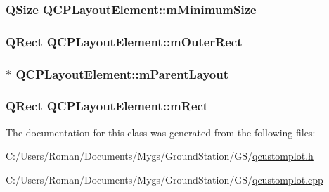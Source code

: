 \subsubsection[{m\+Minimum\+Size}]{\setlength{\rightskip}{0pt plus 5cm}Q\+Size Q\+C\+P\+Layout\+Element\+::m\+Minimum\+Size\hspace{0.3cm}{\ttfamily [protected]}}\label{class_q_c_p_layout_element_affef747c81632de33f08483b7fd10d01}
\hypertarget{class_q_c_p_layout_element_a07bb4973379e75cb0fa5b032c1d24afd}{}
\subsubsection[{m\+Outer\+Rect}]{\setlength{\rightskip}{0pt plus 5cm}Q\+Rect Q\+C\+P\+Layout\+Element\+::m\+Outer\+Rect\hspace{0.3cm}{\ttfamily [protected]}}\label{class_q_c_p_layout_element_a07bb4973379e75cb0fa5b032c1d24afd}
\hypertarget{class_q_c_p_layout_element_ae7c75c25549608bd688bdb65d4c38066}{}
\subsubsection[{m\+Parent\+Layout}]{$\ast$ Q\+C\+P\+Layout\+Element\+::m\+Parent\+Layout\hspace{0.3cm}{\ttfamily [protected]}}\label{class_q_c_p_layout_element_ae7c75c25549608bd688bdb65d4c38066}
\hypertarget{class_q_c_p_layout_element_ad8896f05550389f7b9e92c9e6cdf6e01}{}
\subsubsection[{m\+Rect}]{\setlength{\rightskip}{0pt plus 5cm}Q\+Rect Q\+C\+P\+Layout\+Element\+::m\+Rect\hspace{0.3cm}{\ttfamily [protected]}}\label{class_q_c_p_layout_element_ad8896f05550389f7b9e92c9e6cdf6e01}


The documentation for this class was generated from the following files\+:\begin{DoxyCompactItemize}
\item 
C\+:/\+Users/\+Roman/\+Documents/\+Mygs/\+Ground\+Station/\+G\+S/\hyperlink{qcustomplot_8h}{qcustomplot.\+h}\item 
C\+:/\+Users/\+Roman/\+Documents/\+Mygs/\+Ground\+Station/\+G\+S/\hyperlink{qcustomplot_8cpp}{qcustomplot.\+cpp}\end{DoxyCompactItemize}
